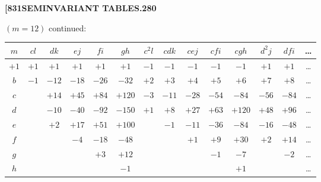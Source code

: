 \documentclass[12pt,a4paper]{article}
\theoremstyle{definition}
\begin{document}
\newpage
\setcounter{page}{280}

\noindent\textbf{[831}\hfill\textbf{SEMINVARIANT TABLES.}\hfill\textbf{280}

\bigskip

\noindent $(m = 12)$ continued:
\begin{center}
\small
\begin{tabular}{|c|c|c|c|c|c|c|c|c|c|c|c|c|c|}
\hline
$m$ & $cl$ & $dk$ & $ej$ & $fi$ & $gh$ & $c^2l$ & $cdk$ & $cej$ & $cfi$ & $cgh$ & $d^2j$ & $dfi$ & \dots \\
\hline
$+1$ & $+1$ & $+1$ & $+1$ & $+1$ & $+1$ & $-1$ & $-1$ & $-1$ & $-1$ & $-1$ & $+1$ & $+1$ & \dots \\
$b$ & $-1$ & $-12$ & $-18$ & $-26$ & $-32$ & $+2$ & $+3$ & $+4$ & $+5$ & $+6$ & $+7$ & $+8$ & \dots \\
$c$ & & $+14$ & $+45$ & $+84$ & $+120$ & $-3$ & $-11$ & $-28$ & $-54$ & $-84$ & $-56$ & $-84$ & \dots \\
$d$ & & $-10$ & $-40$ & $-92$ & $-150$ & $+1$ & $+8$ & $+27$ & $+63$ & $+120$ & $+48$ & $+96$ & \dots \\
$e$ & & $+2$ & $+17$ & $+51$ & $+100$ & & $-1$ & $-11$ & $-36$ & $-84$ & $-16$ & $-48$ & \dots \\
$f$ & & & $-4$ & $-18$ & $-48$ & & & $+1$ & $+9$ & $+30$ & $+2$ & $+14$ & \dots \\
$g$ & & & & $+3$ & $+12$ & & & & $-1$ & $-7$ & & $-2$ & \dots \\
$h$ & & & & & $-1$ & & & & & $+1$ & & & \dots \\
\hline
\end{tabular}
\end{center}

\medskip

\end{document}
